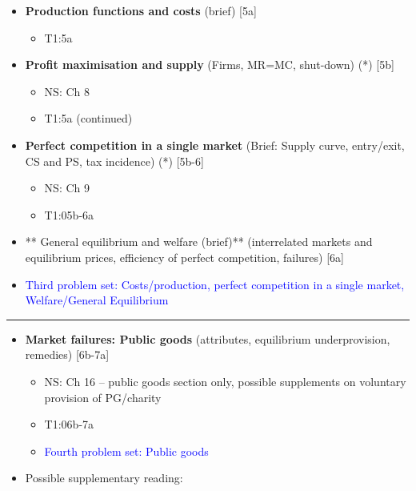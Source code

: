 \documentclass[]{article}
\providecommand{\tightlist}{%
  \setlength{\itemsep}{0pt}\setlength{\parskip}{0pt}}
\begin{document}
\begin{itemize}
\tightlist
\item
  \textbf{Production functions and costs} (brief) {[}5a{]}

  \begin{itemize}
  \tightlist
  \item
    T1:5a
  \end{itemize}
\end{itemize}

\begin{itemize}
\item
  \textbf{Profit maximisation and supply} (Firms, MR=MC, shut-down) (*) {[}5b{]}

  \begin{itemize}
  \tightlist
  \item
    NS: Ch 8
  \item
    T1:5a (continued)
  \end{itemize}
\item
  \textbf{Perfect competition in a single market} (Brief: Supply curve, entry/exit, CS and PS, tax incidence) (*) {[}5b-6{]}

  \begin{itemize}
  \tightlist
  \item
    NS: Ch 9
  \item
    T1:05b-6a
  \end{itemize}
\item
  ** General equilibrium and welfare (brief)** (interrelated markets and equilibrium prices, efficiency of perfect competition, failures) {[}6a{]}
\item
  \textcolor{blue}{Third problem set: Costs/production, perfect competition in a single market, Welfare/General Equilibrium }
\end{itemize}

\begin{center}\rule{0.5\linewidth}{\linethickness}\end{center}

\begin{itemize}
\tightlist
\item
  \textbf{Market failures: Public goods} (attributes, equilibrium underprovision, remedies) {[}6b-7a{]}

  \begin{itemize}
  \tightlist
  \item
    NS: Ch 16 -- public goods section only, possible supplements on voluntary provision of PG/charity
  \item
    T1:06b-7a
  \item
    \textcolor{blue}{Fourth problem set: Public goods }
  \end{itemize}
\item
  Possible supplementary reading:
\end{itemize}
\end{document}
